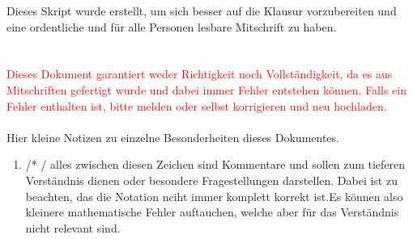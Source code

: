 Dieses Skript wurde erstellt, um sich besser auf die Klausur vorzubereiten und eine ordentliche und für alle Personen lesbare Mitschrift zu haben. \\
\qquad\\
\qquad\\
\textcolor{red}{\Large{Dieses Dokument garantiert weder Richtigkeit noch Vollständigkeit, da es aus Mitschriften gefertigt wurde und dabei immer Fehler entstehen können. Falls ein Fehler enthalten ist, bitte melden oder selbst korrigieren und neu hochladen.}}
\qquad\\
\qquad\\
\large{Hier kleine Notizen zu einzelne Besonderheiten dieses Dokumentes.} \\
\normalsize{
\begin{enumerate}
	\item /* \qquad */  alles zwischen diesen Zeichen sind Kommentare und sollen zum tieferen Verständnis dienen oder besondere Fragestellungen darstellen. Dabei ist zu beachten, das die Notation nciht immer komplett korrekt ist.Es können also kleinere mathematische Fehler auftauchen, welche aber für das Verständnis nicht relevant sind.
\end{enumerate}
}

